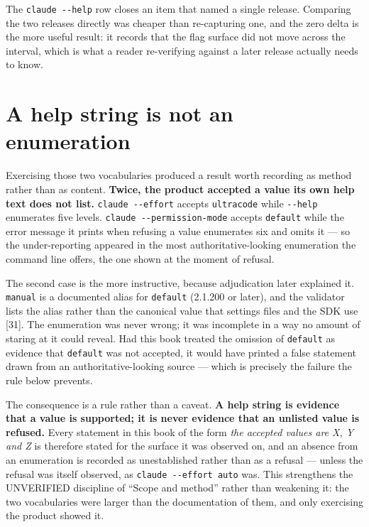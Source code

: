 \documentclass[11pt,a4paper,twoside,openany]{book}
\begin{document}
The \texttt{claude -\allowbreak{}-\allowbreak{}help} row closes an item that named a single release. Comparing the two releases directly was cheaper than re-capturing one, and the zero delta is the more useful result: it records that the flag surface did not move across the interval, which is what a reader re-verifying against a later release actually needs to know.


\FloatBarrier
\section*{A help string is not an enumeration}

Exercising those two vocabularies produced a result worth recording as method rather than as content. \textbf{Twice, the product accepted a value its own help text does not list.} \texttt{claude -\allowbreak{}-\allowbreak{}effort} accepts \texttt{ultracode} while \texttt{-\allowbreak{}-\allowbreak{}help} enumerates five levels. \texttt{claude -\allowbreak{}-\allowbreak{}permission-\allowbreak{}mode} accepts \texttt{default} while the error message it prints when refusing a value enumerates six and omits it — so the under-reporting appeared in the most authoritative-looking enumeration the command line offers, the one shown at the moment of refusal.


The second case is the more instructive, because adjudication later explained it. \texttt{manual} is a documented alias for \texttt{default} (2.1.200 or later), and the validator lists the alias rather than the canonical value that settings files and the SDK use [31]. The enumeration was never wrong; it was incomplete in a way no amount of staring at it could reveal. Had this book treated the omission of \texttt{default} as evidence that \texttt{default} was not accepted, it would have printed a false statement drawn from an authoritative-looking source — which is precisely the failure the rule below prevents.


The consequence is a rule rather than a caveat. \textbf{A help string is evidence that a value is supported; it is never evidence that an unlisted value is refused.} Every statement in this book of the form \emph{the accepted values are X, Y and Z} is therefore stated for the surface it was observed on, and an absence from an enumeration is recorded as unestablished rather than as a refusal — unless the refusal was itself observed, as \texttt{claude -\allowbreak{}-\allowbreak{}effort auto} was. This strengthens the UNVERIFIED discipline of “Scope and method” rather than weakening it: the two vocabularies were larger than the documentation of them, and only exercising the product showed it.
\end{document}
